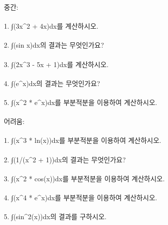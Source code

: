 \documentclass[fleqn]{article}
\begin{document}
중간: \\\\
1. ∫(3x^2 + 4x)dx를 계산하시오. \\\\
   
2. ∫(sin x)dx의 결과는 무엇인가요? \\\\
   
3. ∫(2x^3 - 5x + 1)dx를 계산하시오. \\\\
   
4. ∫(e^x)dx의 결과는 무엇인가요? \\\\
   
5. ∫(x^2 * e^x)dx를 부분적분을 이용하여 계산하시오. \\\\

어려움: \\\\
1. ∫(x^3 * ln(x))dx를 부분적분을 이용하여 계산하시오. \\\\
   
2. ∫(1/(x^2 + 1))dx의 결과는 무엇인가요? \\\\
   
3. ∫(x^2 * cos(x))dx를 부분적분을 이용하여 계산하시오. \\\\
   
4. ∫(x^4 * e^x)dx를 부분적분을 이용하여 계산하시오. \\\\
   
5. ∫(sin^2(x))dx의 결과를 구하시오. \\\\

      
        
\end{document}
